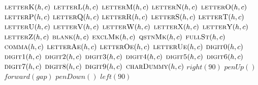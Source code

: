 \documentclass[a4paper,10pt]{article}
\begin{document}
\begin{algorithm}
\begin{algorithmic}[5]
        \State \(\Call{letterK}{h,c}\)
      \EndSelector
        \State \(\Call{letterL}{h,c}\)
      \EndSelector
        \State \(\Call{letterM}{h,c}\)
      \EndSelector
        \State \(\Call{letterN}{h,c}\)
      \EndSelector
        \State \(\Call{letterO}{h,c}\)
      \EndSelector
        \State \(\Call{letterP}{h,c}\)
      \EndSelector
        \State \(\Call{letterQ}{h,c}\)
      \EndSelector
        \State \(\Call{letterR}{h,c}\)
      \EndSelector
        \State \(\Call{letterS}{h,c}\)
      \EndSelector
        \State \(\Call{letterT}{h,c}\)
      \EndSelector
        \State \(\Call{letterU}{h,c}\)
      \EndSelector
        \State \(\Call{letterV}{h,c}\)
      \EndSelector
        \State \(\Call{letterW}{h,c}\)
      \EndSelector
        \State \(\Call{letterX}{h,c}\)
      \EndSelector
        \State \(\Call{letterY}{h,c}\)
      \EndSelector
        \State \(\Call{letterZ}{h,c}\)
      \EndSelector
        \State \(\Call{blank}{h,c}\)
      \EndSelector
        \State \(\Call{exclMk}{h,c}\)
      \EndSelector
        \State \(\Call{qstnMk}{h,c}\)
      \EndSelector
        \State \(\Call{fullSt}{h,c}\)
      \EndSelector
        \State \(\Call{comma}{h,c}\)
      \EndSelector
        \State \(\Call{letterAe}{h,c}\)
      \EndSelector
        \State \(\Call{letterOe}{h,c}\)
      \EndSelector
        \State \(\Call{letterUe}{h,c}\)
      \EndSelector
        \State \(\Call{digit0}{h,c}\)
      \EndSelector
        \State \(\Call{digit1}{h,c}\)
      \EndSelector
        \State \(\Call{digit2}{h,c}\)
      \EndSelector
        \State \(\Call{digit3}{h,c}\)
      \EndSelector
        \State \(\Call{digit4}{h,c}\)
      \EndSelector
        \State \(\Call{digit5}{h,c}\)
      \EndSelector
        \State \(\Call{digit6}{h,c}\)
      \EndSelector
        \State \(\Call{digit7}{h,c}\)
      \EndSelector
        \State \(\Call{digit8}{h,c}\)
      \EndSelector
        \State \(\Call{digit9}{h,c}\)
      \EndSelector
      \Other
        \State \(\Call{charDummy}{h,c}\)
      \EndOther
    \EndCase
    \State \(right(90)\)
    \State \(penUp()\)
    \State \(forward(gap)\)
    \State \(penDown()\)
    \State \(left(90)\)
  \EndFor
\EndProcedure
\end{algorithmic}
\end{algorithm}
\end{document}
